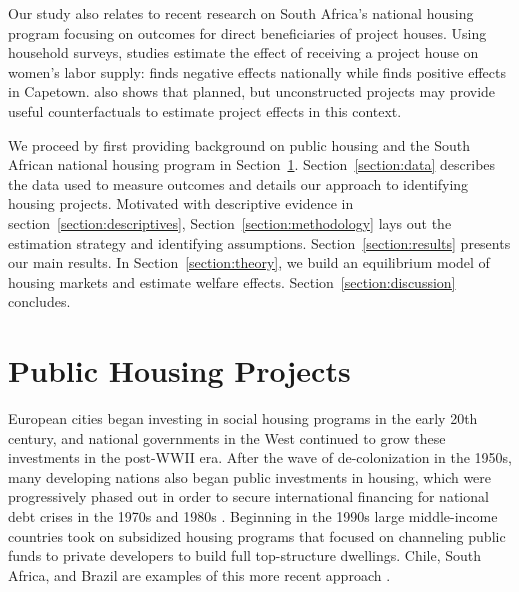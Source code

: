 \documentclass[12pt]{article}
\begin{document}
Our study also relates to recent research on South Africa's national housing program focusing on outcomes for direct beneficiaries of project houses.  Using household surveys, studies estimate the effect of receiving a project house on women's labor supply: \cite{picarelli2019there}  finds negative effects nationally while \cite{franklin2016enabled} finds positive effects in Capetown.  \cite{franklin2016enabled} also shows that planned, but unconstructed projects may provide useful counterfactuals to estimate project effects in this context.


We proceed by first providing background on public housing and the South African national housing program in Section~\ref{section:background}.  Section~\ref{section:data} describes the data used to measure outcomes and details our approach to identifying housing projects. Motivated with descriptive evidence in section~\ref{section:descriptives}, Section~\ref{section:methodology} lays out the estimation strategy and identifying assumptions. Section~\ref{section:results} presents our main results.  In Section~\ref{section:theory}, we build an equilibrium model of housing markets and estimate welfare effects.   Section~\ref{section:discussion} concludes.




\section{Public Housing Projects}\label{section:background}


European cities began investing in social housing programs in the early 20th century, and national governments in the West continued to grow these investments in the post-WWII era. After the wave of de-colonization in the 1950s, many developing nations also began public investments in housing, which were progressively phased out in order to secure international financing for national debt crises in the 1970s and 1980s \citep{rondinelli1990housing}. Beginning in the 1990s large middle-income countries took on subsidized housing programs that focused on channeling public funds to private developers to build full top-structure dwellings. Chile, South Africa, and Brazil are examples of this more recent approach \citep{buckley2005housing}.
\end{document}
